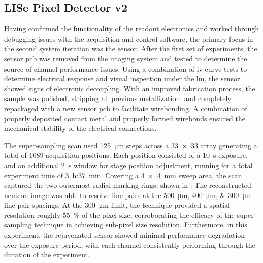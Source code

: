 \documentclass[../../../main.tex]{subfiles}%
\begin{document}
%
    \subsection{LISe Pixel Detector v2}%
    \label{sec:chapter-4:semiconductor-16-channel:version-2}%
    Having confirmed the functionality of the readout electronics and worked through debugging issues with the acquisition and control software, the primary focus in the second system iteration was the sensor.
    After the first set of experiments, the sensor \gls{pcb} was removed from the imaging system and tested to determine the source of channel performance issues.
    Using a combination of \gls{iv} curve tests to determine electrical response and visual inspection under the \gls{lm}, the sensor showed signs of electronic decoupling.
    With an improved fabrication process, the sample was polished, stripping all previous metallization, and completely repackaged with a new sensor \gls{pcb} to facilitate wirebonding.
    A combination of properly deposited contact metal and properly formed wirebonds ensured the mechanical stability of the electrical connections.
    \par%
    The \gls{super-sampling} scan used \SI{125}{\micro\meter} steps across a \num{33x33} array generating a total of \num{1089} acquisition positions.
    Each position consisted of a \SI{10}{\second} exposure, and an additional \SI{2}{\second} window for stage position adjustment, running for a total experiment time of \SI{3}{\hour}:\SI{37}{\minute}.
    Covering a \SI{4x4}{\milli\meter} sweep area, the scan captured the two outermost radial marking rings, shown in .
    The reconstructed neutron image was able to resolve line pairs at the \SIlist{500;400;300}{\micro\meter} line pair spacings.
    At the \SI{300}{\micro\meter} limit, the technique provided a spatial resolution roughly \SI{55}{\percent} of the pixel size, corroborating the efficacy of the \gls{super-sampling} technique in achieving sub-pixel size resolution.
    Furthermore, in this experiment, the rejuvenated sensor showed minimal performance degradation over the exposure period, with each channel consistently performing through the duration of the experiment.
\end{document}
